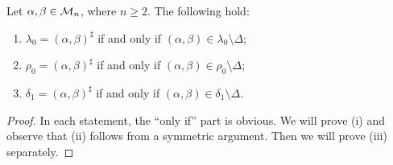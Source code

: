 \begin{lemma}
  \label{lem:low-genpairs}
  Let $\alpha,\beta \in \mathcal{M}_n$, where $n \geq 2$.  The following hold:
  \begin{enumerate}[\rm(i)]
  \item $\lambda_0 = (\alpha, \beta)^\sharp$ if and only if
    $(\alpha,\beta) \in \lambda_0 \setminus \Delta$;
  \item $\rho_0 = (\alpha, \beta)^\sharp$ if and only if
    $(\alpha,\beta) \in \rho_0 \setminus \Delta$;
  \item $\delta_1 = (\alpha, \beta)^\sharp$ if and only if
    $(\alpha,\beta) \in \delta_1 \setminus \Delta$.
  \end{enumerate}
  \begin{proof}
    In each statement, the ``only if'' part is obvious.  We will prove (i) and
    observe that (ii) follows from a symmetric argument.  Then we will prove
    (iii) separately. %


\end{proof}
\end{lemma}
